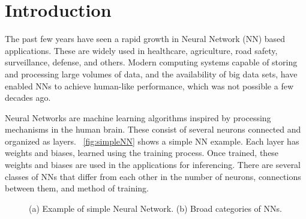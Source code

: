 \documentclass[a4paper,10pt]{article}
\begin{document}

\newpage
\setcounter{tocdepth}{2}
\tableofcontents
\newpage

\section{Introduction}
The past few years have seen a rapid growth in Neural Network (NN) based applications. These are widely used in healthcare, agriculture, road safety, surveillance, defense, and others. Modern computing systems capable of storing and processing large volumes of data, and the availability of big data sets, have enabled NNs to achieve human-like performance, which was not possible a few decades ago.

Neural Networks are machine learning algorithms inspired by processing mechanisms in the human brain. These consist of several neurons connected and organized as layers. \figurename{~\ref{fig:simpleNN}} shows a simple NN example. Each layer has weights and biases, learned using the training process. Once trained, these weights and biases are used in the applications for inferencing. There are several classes of NNs that differ from each other in the number of neurons, connections between them, and method of training. 
\begin{figure}[!htb]
	\centering
    \captionsetup{font=sf}
	\hfil
	\hfil
	\caption{(a) Example of simple Neural Network. (b) Broad categories of NNs.}
	\label{fig:intro}
\end{figure}
\end{document}
